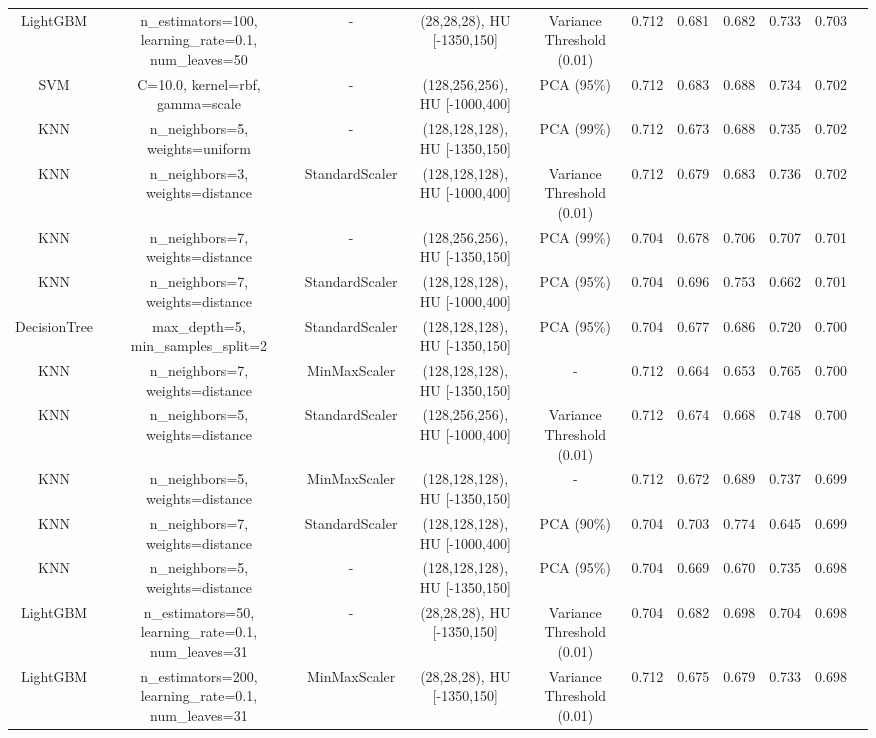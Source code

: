 \begin{sidewaystable}[!htbp]
{\begin{tabular}{ccccccccccc}
LightGBM & n\_estimators=100, learning\_rate=0.1, num\_leaves=50 & - & (28,28,28), HU [-1350,150] & Variance Threshold (0.01) & 0.712 & 0.681 & 0.682 & 0.733 & 0.703 \\
SVM & C=10.0, kernel=rbf, gamma=scale & - & (128,256,256), HU [-1000,400] & PCA (95\%) & 0.712 & 0.683 & 0.688 & 0.734 & 0.702 \\
KNN & n\_neighbors=5, weights=uniform & - & (128,128,128), HU [-1350,150] & PCA (99\%) & 0.712 & 0.673 & 0.688 & 0.735 & 0.702 \\
KNN & n\_neighbors=3, weights=distance & StandardScaler & (128,128,128), HU [-1000,400] & Variance Threshold (0.01) & 0.712 & 0.679 & 0.683 & 0.736 & 0.702 \\
KNN & n\_neighbors=7, weights=distance & - & (128,256,256), HU [-1350,150] & PCA (99\%) & 0.704 & 0.678 & 0.706 & 0.707 & 0.701 \\
KNN & n\_neighbors=7, weights=distance & StandardScaler & (128,128,128), HU [-1000,400] & PCA (95\%) & 0.704 & 0.696 & 0.753 & 0.662 & 0.701 \\
DecisionTree & max\_depth=5, min\_samples\_split=2 & StandardScaler & (128,128,128), HU [-1350,150] & PCA (95\%) & 0.704 & 0.677 & 0.686 & 0.720 & 0.700 \\
KNN & n\_neighbors=7, weights=distance & MinMaxScaler & (128,128,128), HU [-1350,150] & - & 0.712 & 0.664 & 0.653 & 0.765 & 0.700 \\
KNN & n\_neighbors=5, weights=distance & StandardScaler & (128,256,256), HU [-1000,400] & Variance Threshold (0.01) & 0.712 & 0.674 & 0.668 & 0.748 & 0.700 \\
KNN & n\_neighbors=5, weights=distance & MinMaxScaler & (128,128,128), HU [-1350,150] & - & 0.712 & 0.672 & 0.689 & 0.737 & 0.699 \\
KNN & n\_neighbors=7, weights=distance & StandardScaler & (128,128,128), HU [-1000,400] & PCA (90\%) & 0.704 & 0.703 & 0.774 & 0.645 & 0.699 \\
KNN & n\_neighbors=5, weights=distance & - & (128,128,128), HU [-1350,150] & PCA (95\%) & 0.704 & 0.669 & 0.670 & 0.735 & 0.698 \\
LightGBM & n\_estimators=50, learning\_rate=0.1, num\_leaves=31 & - & (28,28,28), HU [-1350,150] & Variance Threshold (0.01) & 0.704 & 0.682 & 0.698 & 0.704 & 0.698 \\
LightGBM & n\_estimators=200, learning\_rate=0.1, num\_leaves=31 & MinMaxScaler & (28,28,28), HU [-1350,150] & Variance Threshold (0.01) & 0.712 & 0.675 & 0.679 & 0.733 & 0.698 \\

\end{tabular}}
\end{sidewaystable}
